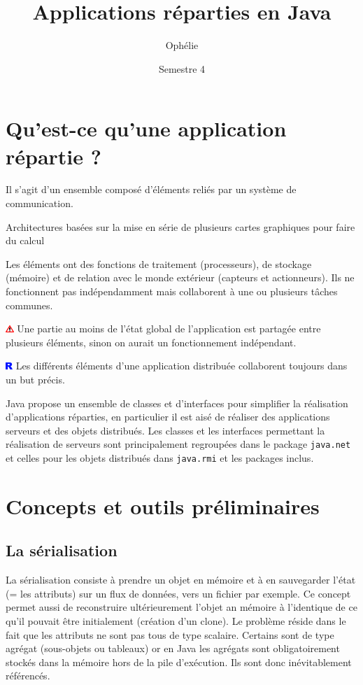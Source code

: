 \documentclass[a4paper,11pt]{report}
\title{Applications réparties en Java}
\author{Ophélie \bsc{FRAISIER}}
\date{Semestre 4}
\newcommand{\attention}[1]{
	\begin{center}
	\medskip
	\colorbox{attention}{
		\begin{minipage}{0.8\textwidth}\medskip\includegraphics[height=10px]{images/attention.png} #1 \medskip\end{minipage}
	}
	\medskip
	\end{center}
}
\newcommand{\remarque}[1]{
	\begin{center}
	\medskip
	\colorbox{remarque}{
		\begin{minipage}{0.8\textwidth}\medskip\includegraphics[height=10px]{images/remarque.png} #1 \medskip\end{minipage}
	}
	\medskip
	\end{center}
}
\newcommand{\exemple}[1]{
	\begin{center}
	\medskip
	\colorbox{exemple}{
		\begin{minipage}{0.8\textwidth}\medskip#1 \medskip\end{minipage}
	}
	\medskip
	\end{center}
}
\begin{document}
 
\maketitle
\tableofcontents

\chapter{Qu\rq{}est-ce qu\rq{}une application répartie ?}

Il s\rq{}agit d\rq{}un ensemble composé d\rq{}éléments reliés par un système de communication.

\exemple{Architectures basées sur la mise en série de plusieurs cartes graphiques pour faire du calcul}

 Les éléments ont des fonctions de traitement (processeurs), de stockage (mémoire) et de relation avec le monde extérieur (capteurs et actionneurs). Ils ne fonctionnent pas indépendamment mais collaborent à une ou plusieurs tâches communes.

\attention{Une partie au moins de l\rq{}état global de l\rq{}application est partagée entre plusieurs éléments, sinon on aurait un fonctionnement indépendant.}

\remarque{Les différents éléments d\rq{}une application distribuée collaborent toujours dans un but précis.}

Java propose un ensemble de classes et d\rq{}interfaces pour simplifier la réalisation d\rq{}applications réparties, en particulier il est aisé de réaliser des applications serveurs et des objets distribués. Les classes et les interfaces permettant la réalisation de serveurs sont principalement regroupées dans le package \texttt{java.net} et celles pour les objets distribués dans \texttt{java.rmi} et les packages inclus.


\chapter{Concepts et outils préliminaires}
\section{La sérialisation}
La sérialisation consiste à prendre un objet en mémoire et à en sauvegarder l\rq{}état (= les attributs) sur un flux de données, vers un fichier par exemple. Ce concept permet aussi de reconstruire ultérieurement l\rq{}objet an mémoire à l\rq{}identique de ce qu\rq{}il pouvait être initialement (création d\rq{}un clone). Le problème réside dans le fait que les attributs ne sont pas tous de type scalaire. Certains sont de type agrégat (sous-objets ou tableaux) or en Java les agrégats sont obligatoirement stockés dans la mémoire hors de la pile d\rq{}exécution. Ils sont donc  inévitablement référencés.
\end{document}
